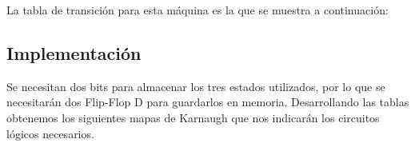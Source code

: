 La tabla de transición para esta máquina es la que se muestra a continuación:

\begin{table}[H]
\begin{center}
\label{Tabla_de_transiciones_Ej3}
\caption{Tabla de transiciones}
\end{center}
\end{table}


\subsection{Implementación}

Se necesitan dos bits para almacenar los tres estados utilizados, por lo que se necesitarán dos Flip-Flop D para guardarlos en memoria.
Desarrollando las tablas obtenemos los siguientes mapas de Karnaugh que nos indicarán los circuitos lógicos necesarios.

